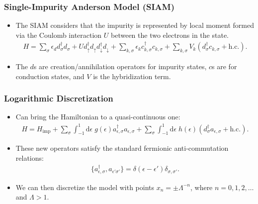 \documentclass{beamer}
\newcommand{\dd}{\mathrm{d}}
\begin{document}
\begin{frame}
  \frametitle{Single-Impurity Anderson Model (SIAM)}

  \begin{itemize}
  \item The SIAM considers that the impurity is represented by local moment formed via the Coulomb interaction $U$ between the two electrons in the state.
    \begin{gather*}
      H = \sum_\sigma \epsilon_d d^\dagger_\sigma d_\sigma + Ud^\dagger_\uparrow d_\uparrow d^\dagger_\downarrow d_\downarrow + \sum_{k,\sigma} \epsilon_k c^\dagger_{k,\sigma}c_{k,\sigma} + \sum_{k,\sigma} V_k(d^\dagger_\sigma c_{k,\sigma} + \mathrm{h.c.}).
    \end{gather*}
  \item The $d$s are creation/annihilation operators for impurity states, $c$s are for conduction states, and $V$ is the hybridization term.
  \end{itemize}
\end{frame}

\begin{frame}
  \frametitle{Logarithmic Discretization}

  \begin{itemize}
  \item Can bring the Hamiltonian to a quasi-continuous one:
    \begin{gather*}
      H = H_{\mathrm{imp}} + \sum_\sigma \int_{-1}^1 \dd\epsilon \; g(\epsilon) a^\dagger_{\epsilon,\sigma}a_{\epsilon,\sigma} + \sum_\sigma \int_{-1}^1 \dd\epsilon \; h(\epsilon) (d^\dagger_\sigma a_{\epsilon,\sigma} + \mathrm{h.c.}).
    \end{gather*}
  \item These new operators satisfy the standard fermionic anti-commutation relations:
    \begin{gather*}
      \{ a^\dagger_{\epsilon,\sigma},a_{\epsilon'\sigma'} \} = \delta(\epsilon-\epsilon')\delta_{\sigma,\sigma'}.
    \end{gather*}
  \item We can then discretize the model with points $x_n = \pm \Lambda^{-n}$, where $n =0,1,2,\ldots$ and $\Lambda > 1$.
  \end{itemize}
\end{frame}
\end{document}
